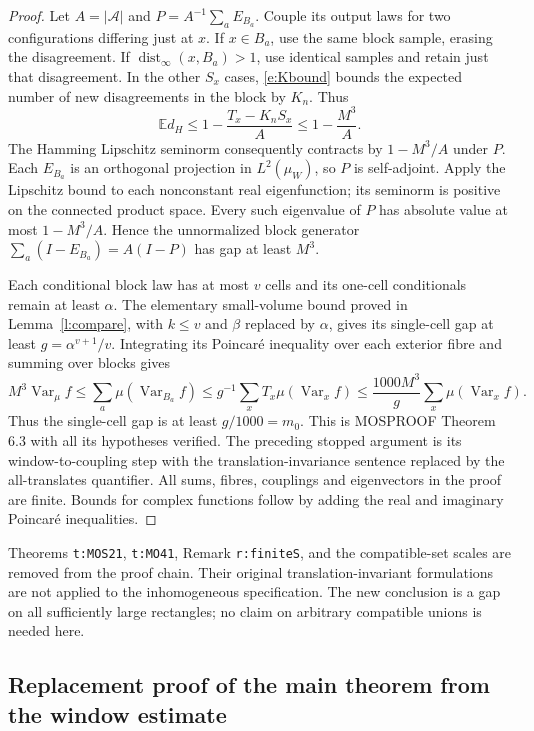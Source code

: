 \documentclass[11pt,reqno]{amsart}
\theoremstyle{definition}
\newcommand{\E}{\mathbb E}
\newcommand{\Var}{\operatorname{Var}}
\newcommand{\dist}{\operatorname{dist}_\infty}
\begin{document}
\begin{proof}
Let $A=|\mathcal A|$ and $P=A^{-1}\sum_a E_{B_a}$. Couple its output
laws for two configurations differing just at $x$. If $x\in B_a$,
use the same block sample, erasing the disagreement. If
$\dist(x,B_a)>1$, use identical samples and retain just that
disagreement. In the other $S_x$ cases, \eqref{e:Kbound} bounds the
expected number of new disagreements in the block by $K_n$. Thus
\[
 \E d_H\le1-\frac{T_x-K_nS_x}{A}\le1-\frac{M^3}{A}.
\]
The Hamming Lipschitz seminorm consequently contracts by
$1-M^3/A$ under $P$. Each $E_{B_a}$ is an orthogonal projection in
$L^2(\mu_W)$, so $P$ is self-adjoint. Apply the Lipschitz bound to
each nonconstant real eigenfunction; its seminorm is positive on the
connected product space. Every such eigenvalue of $P$ has absolute
value at most $1-M^3/A$. Hence the unnormalized block generator
$\sum_a(I-E_{B_a})=A(I-P)$ has gap at least $M^3$.

Each conditional block law has at most $v$ cells and its one-cell
conditionals remain at least $\alpha$. The elementary small-volume
bound proved in Lemma~\ref{l:compare}, with $k\le v$ and $\beta$
replaced by $\alpha$, gives its single-cell gap at least
$g=\alpha^{v+1}/v$. Integrating its Poincar\'e inequality over each
exterior fibre and summing over blocks gives
\[
 M^3\Var_\mu f
 \le\sum_a\mu(\Var_{B_a}f)
 \le g^{-1}\sum_x T_x\mu(\Var_xf)
 \le\frac{1000M^3}{g}\sum_x\mu(\Var_xf).
\]
Thus the single-cell gap is at least $g/1000=m_0$.
This is MOSPROOF Theorem 6.3 with all its hypotheses verified. The
preceding stopped argument is its window-to-coupling step with the
translation-invariance sentence replaced by the all-translates
quantifier. All sums, fibres, couplings and eigenvectors in the proof
are finite. Bounds for complex functions follow by adding the real
and imaginary Poincar\'e inequalities.
\end{proof}

Theorems \texttt{t:MOS21}, \texttt{t:MO41}, Remark \texttt{r:finiteS},
and the compatible-set scales are removed from the proof chain.
Their original translation-invariant formulations are not applied to
the inhomogeneous specification. The new conclusion is a gap on all
sufficiently large rectangles; no claim on arbitrary compatible unions
is needed here.

\subsection{Replacement proof of the main theorem from the window estimate}
\end{document}
